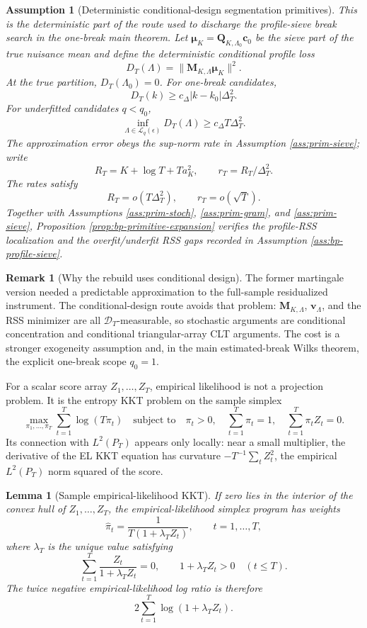 \documentclass[12pt]{article}
\numberwithin{equation}{section}
\newtheorem{lemma}{Lemma}
\newtheorem{assumption}{Assumption}
\theoremstyle{definition}
\newtheorem{remark}{Remark}
\newcommand{\D}{\mathcal D}
\begin{document}
\begin{assumption}[Deterministic conditional-design segmentation primitives]
\label{ass:sol-localization}
This is the deterministic part of the route used to discharge the profile-sieve
break search in the one-break main theorem.  Let
\(\bm\mu_K=\bm Q_{K,\Lambda_0}\bm c_0\) be the sieve part of the true nuisance
mean and define the deterministic conditional profile loss
\[
    D_T(\Lambda)=\|\bm M_{K,\Lambda}\bm\mu_K\|^2.
\]
At the true partition, \(D_T(\Lambda_0)=0\).  For one-break candidates,
\[
    D_T(k)\geq c_\Delta |k-k_0|\Delta_T^2.
\]
For underfitted candidates \(q<q_0\),
\[
    \inf_{\Lambda\in\mathcal L_q(\epsilon)}D_T(\Lambda)
    \geq c_\Delta T\Delta_T^2.
\]
The approximation error obeys the sup-norm rate in Assumption
\ref{ass:prim-sieve}; write
\[
    R_T=K+\log T+Ta_K^2,
    \qquad
    r_T=R_T/\Delta_T^2.
\]
The rates satisfy
\[
    R_T=o(T\Delta_T^2),
    \qquad
    r_T=o(\sqrt T).
\]
Together with Assumptions \ref{ass:prim-stoch}, \ref{ass:prim-gram}, and
\ref{ass:prim-sieve}, Proposition \ref{prop:bp-primitive-expansion} verifies
the profile-RSS localization and the overfit/underfit RSS gaps recorded in
Assumption \ref{ass:bp-profile-sieve}.
\end{assumption}

\begin{remark}[Why the rebuild uses conditional design]
The former martingale version needed a predictable approximation to the
full-sample residualized instrument.  The conditional-design route avoids that
problem: \(\bm M_{K,\Lambda}\), \(\bm v_\Lambda\), and the RSS minimizer are
all \(\D_T\)-measurable, so stochastic arguments are conditional concentration
and conditional triangular-array CLT arguments.  The cost is a stronger
exogeneity assumption and, in the main estimated-break Wilks theorem, the
explicit one-break scope \(q_0=1\).
\end{remark}

For a scalar score array \(Z_1,\ldots,Z_T\), empirical likelihood is not a
projection problem. It is the entropy KKT problem on the sample simplex
\[
    \max_{\pi_1,\ldots,\pi_T}
    \sum_{t=1}^T\log(T\pi_t)
    \quad\text{subject to}\quad
    \pi_t>0,\quad
    \sum_{t=1}^T\pi_t=1,\quad
    \sum_{t=1}^T\pi_tZ_t=0.
\]
Its connection with \(L^2(P_T)\) appears only locally: near a small multiplier,
the derivative of the EL KKT equation has curvature
\(-T^{-1}\sum_t Z_t^2\), the empirical \(L^2(P_T)\) norm squared of the score.

\begin{lemma}[Sample empirical-likelihood KKT]
\label{lem:sample-el-kkt}
If zero lies in the interior of the convex hull of \(Z_1,\ldots,Z_T\), the
empirical-likelihood simplex program has weights
\[
    \widehat\pi_t
    =
    \frac{1}{T(1+\lambda_TZ_t)},
    \qquad t=1,\ldots,T,
\]
where \(\lambda_T\) is the unique value satisfying
\[
    \sum_{t=1}^T\frac{Z_t}{1+\lambda_TZ_t}=0,
    \qquad
    1+\lambda_TZ_t>0\quad(t\leq T).
\]
The twice negative empirical-likelihood log ratio is therefore
\[
    2\sum_{t=1}^T\log(1+\lambda_TZ_t).
\]
\end{lemma}
\end{document}
